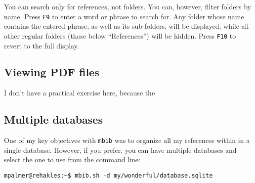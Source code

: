 \documentclass[10pt]{article}
\newcommand*{\mbib}{\texttt{mbib}\xspace}
\newcommand*{\key}[1]{\texttt{#1}\xspace}
\begin{document}
\noindent You can search only for references, not folders. You can, however, filter folders by name. Press \key{F9} to enter a word or phrase to search for. Any folder whose name contains the entered phrase, as well as its sub-folders, will be displayed, while all other regular folders (those below ``References'') will be hidden. Press \key{F10} to revert to the full display. 

\subsection{Viewing PDF files}

I don't have a practical exercise here, because the 

\subsection{Multiple databases}

One of my key objectives with \mbib was to organize all my references within in a single database. However, if you prefer, you can have multiple databases and select the one to use from the command line: 

\begin{verbatim}
mpalmer@rehakles:~$ mbib.sh -d my/wonderful/database.sqlite
\end{verbatim}

\begin{comment}
\section{Running \mbib}

The program runs inside a console window. Assuming you have put a start-up script into your shell's path, just open a shell window (e.g.\ \texttt{konsole} on KDE, or \texttt{xterm} on any X-based desktop) and run \texttt{mbib.sh}.

%
%




\subsection{The user interface}

\begin{itemize}
\item navigation (mouse, keyboard)
\item viewing and editing references
\item importing references
\item moving things around (using selections)
\item searching and filtering
\item using the clipboard (requires xclip)
\item 
\end{itemize}

\end{comment}
\end{document}
